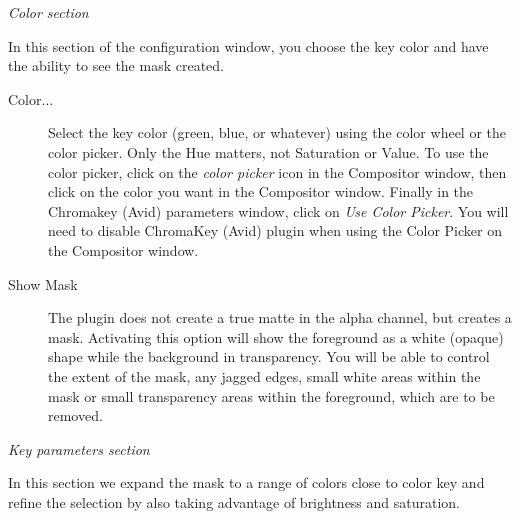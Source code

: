 \qquad \textit{Color section}

In this section of the configuration window, you choose the key color and have the ability to see the mask created.

\begin{description}
	\item[Color...] Select the key color (green, blue, or whatever) using the color wheel or the color picker. Only the Hue matters, not Saturation or Value. To use the color picker, click on the \textit{color picker} icon in the Compositor window, then click on the color you want in the Compositor window. Finally  in the Chromakey (Avid) parameters window, click on \textit{Use Color Picker}. You will need to disable ChromaKey (Avid) plugin when using the Color Picker on the Compositor window.
	\item[Show Mask] The plugin does not create a true matte in the alpha channel, but creates a mask. Activating this option will show the foreground as a white (opaque) shape while the background in transparency. You will be able to control the extent of the mask, any jagged edges, small white areas within the mask or small transparency areas within the foreground, which are to be removed.
\end{description}

\qquad \textit{Key parameters section}

In this section we expand the mask to a range of colors close to color key and refine the selection by also taking advantage of brightness and saturation.


